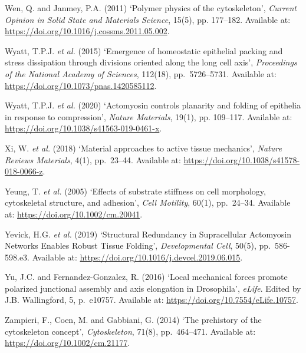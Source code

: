 \documentclass[
]{article}
\begin{document}
Wen, Q. and Janmey, P.A. (2011) `Polymer physics of the cytoskeleton',
\emph{Current Opinion in Solid State and Materials Science}, 15(5), pp.
177--182. Available at:
\url{https://doi.org/10.1016/j.cossms.2011.05.002}.

Wyatt, T.P.J. \emph{et al.} (2015) `Emergence of homeostatic epithelial
packing and stress dissipation through divisions oriented along the long
cell axis', \emph{Proceedings of the National Academy of Sciences},
112(18), pp.~5726--5731. Available at:
\url{https://doi.org/10.1073/pnas.1420585112}.

Wyatt, T.P.J. \emph{et al.} (2020) `Actomyosin controls planarity and
folding of epithelia in response to compression', \emph{Nature
Materials}, 19(1), pp. 109--117. Available at:
\url{https://doi.org/10.1038/s41563-019-0461-x}.

Xi, W. \emph{et al.} (2018) `Material approaches to active tissue
mechanics', \emph{Nature Reviews Materials}, 4(1), pp.~23--44. Available
at: \url{https://doi.org/10.1038/s41578-018-0066-z}.

Yeung, T. \emph{et al.} (2005) `Effects of substrate stiffness on cell
morphology, cytoskeletal structure, and adhesion', \emph{Cell Motility},
60(1), pp.~24--34. Available at: \url{https://doi.org/10.1002/cm.20041}.

Yevick, H.G. \emph{et al.} (2019) `Structural Redundancy in
Supracellular Actomyosin Networks Enables Robust Tissue Folding',
\emph{Developmental Cell}, 50(5), pp.~586-598.e3. Available at:
\url{https://doi.org/10.1016/j.devcel.2019.06.015}.

Yu, J.C. and Fernandez-Gonzalez, R. (2016) `Local mechanical forces
promote polarized junctional assembly and axis elongation in
Drosophila', \emph{eLife}. Edited by J.B. Wallingford, 5, p.~e10757.
Available at: \url{https://doi.org/10.7554/eLife.10757}.

Zampieri, F., Coen, M. and Gabbiani, G. (2014) `The prehistory of the
cytoskeleton concept', \emph{Cytoskeleton}, 71(8), pp.~464--471.
Available at: \url{https://doi.org/10.1002/cm.21177}.
\end{document}
